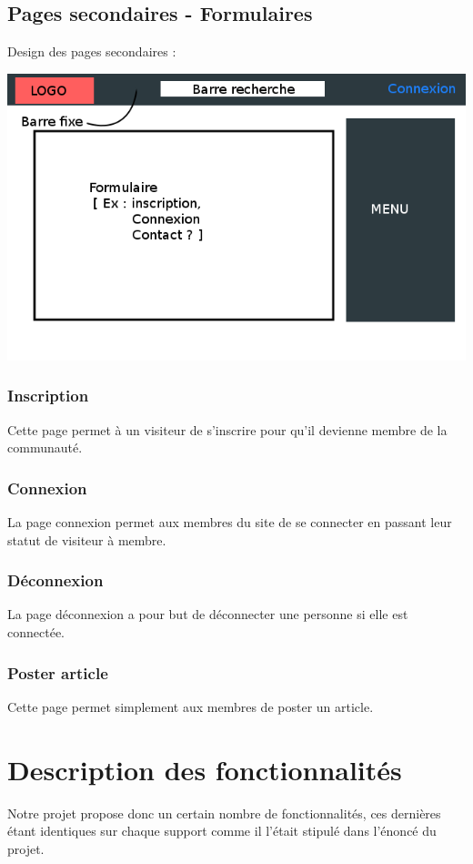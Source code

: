 \documentclass{article}
\begin{document}
\subsection{Pages secondaires - Formulaires}
\begin{center}
Design des pages secondaires :
\end{center}
\includegraphics[scale=0.7]{formulaires.png}

\subsubsection{Inscription}
Cette page permet à un visiteur de s'inscrire pour qu'il devienne membre de la communauté.

\subsubsection{Connexion}
La page connexion permet aux membres du site de se connecter en passant leur statut de visiteur à membre.

\subsubsection{Déconnexion}
La page déconnexion a pour but de déconnecter une personne si elle est connectée.

\subsubsection{Poster article}
Cette page permet simplement aux membres de poster un article.

\section{Description des fonctionnalités}
Notre projet propose donc un certain nombre de fonctionnalités, ces dernières étant identiques sur chaque support comme il l'était stipulé dans l'énoncé du projet.
\end{document}
